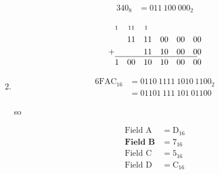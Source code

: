 \documentclass[12pt,letterpaper,fleqn]{article}
\begin{document}
\begin{enumerate}
  \begin{align*}
    340_8 &= 011\ 100\ 000_2
  \end{align*}

  \begin{alignat*}{12}
    & \text{\scriptsize 1} & \text{\scriptsize 1} & \text{\scriptsize 1} & \text{\scriptsize 1} & & & & & & & \\
    & & 1 & 1 & 1 & 1 & 0 & 0 & 0 & 0 & 0 & 0 \\
    + & & & & 1 & 1 & 1 & 0 & 0 & 0 & 0 & 0 \\[-1.2em]
    \cline{2-11} \\[-2em]
    & 1 & 0 & 0 & 1 & 0 & 1 & 0 & 0 & 0 & 0 & 0
  \end{alignat*}

\item \begin{align*}
  6\text{FAC}_{16} &= 0110\ 1111\ 1010\ 1100_2 \\
  &= 01101\ 111\ 101\ 01100
\end{align*}

  so

  \begin{align*}
    \text{Field A} &= \text{D}_{16} \\
    \textbf{Field B} &= 7_{16} \\
    \text{Field C} &= 5_{16} \\
    \text{Field D} &= \text{C}_{16}
  \end{align*}

\end{enumerate}
\end{document}
